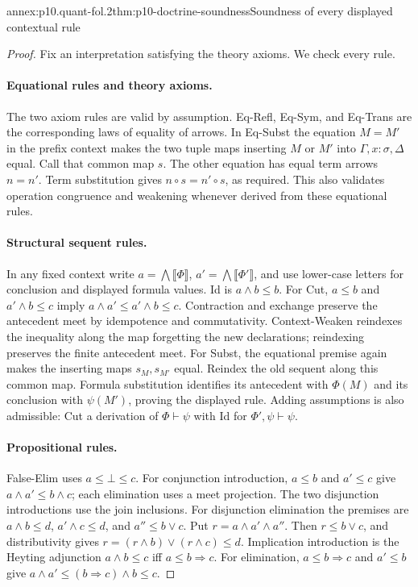 \begin{annexitem}{annex:p10.quant-fol.2}{thm:p10-doctrine-soundness}{Soundness of every displayed contextual rule}
\begin{proof}
Fix an interpretation satisfying the theory axioms. We check every rule.

\paragraph{Equational rules and theory axioms.}
The two axiom rules are valid by assumption.
Eq-Refl, Eq-Sym, and Eq-Trans are the corresponding laws of equality
of arrows. In Eq-Subst the equation \(M=M'\) in the prefix context
makes the two tuple maps inserting \(M\) or \(M'\) into
\(\Gamma,x:\sigma,\Delta\) equal. Call that common map \(s\).
The other equation has equal term arrows \(n=n'\).
Term substitution gives \(n\circ s=n'\circ s\), as required.
This also validates operation congruence and weakening whenever
derived from these equational rules.

\paragraph{Structural sequent rules.}
In any fixed context write \(a=\bigwedge\llbracket\Phi\rrbracket\),
\(a'=\bigwedge\llbracket\Phi'\rrbracket\), and use lower-case letters
for conclusion and displayed formula values.
Id is \(a\wedge b\leq b\).
For Cut, \(a\leq b\) and \(a'\wedge b\leq c\) imply
\(a\wedge a'\leq a'\wedge b\leq c\).
Contraction and exchange preserve the antecedent meet by idempotence
and commutativity.
Context-Weaken reindexes the inequality along the map forgetting the
new declarations; reindexing preserves the finite antecedent meet.
For Subst, the equational premise again makes the inserting maps
\(s_M,s_{M'}\) equal. Reindex the old sequent along this common map.
Formula substitution identifies its antecedent with \(\Phi(M)\)
and its conclusion with \(\psi(M')\), proving the displayed rule.
Adding assumptions is also admissible: Cut a derivation of
\(\Phi\vdash\psi\) with Id for \(\Phi',\psi\vdash\psi\).

\paragraph{Propositional rules.}
False-Elim uses \(a\leq\bot\leq c\).
For conjunction introduction, \(a\leq b\) and \(a'\leq c\) give
\(a\wedge a'\leq b\wedge c\); each elimination uses a meet projection.
The two disjunction introductions use the join inclusions.
For disjunction elimination the premises are
\(a\wedge b\leq d\), \(a'\wedge c\leq d\), and
\(a''\leq b\vee c\).
Put \(r=a\wedge a'\wedge a''\).
Then \(r\leq b\vee c\), and distributivity gives
\(r=(r\wedge b)\vee(r\wedge c)\leq d\).
Implication introduction is the Heyting adjunction
\(a\wedge b\leq c\) iff \(a\leq b\Rightarrow c\).
For elimination, \(a\leq b\Rightarrow c\) and \(a'\leq b\)
give \(a\wedge a'\leq(b\Rightarrow c)\wedge b\leq c\).


\end{proof}
\end{annexitem}
